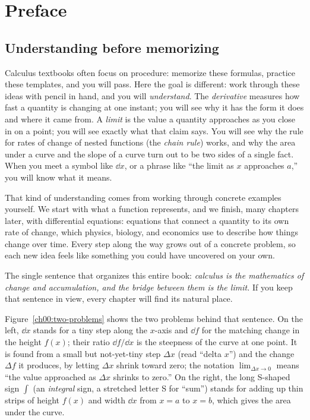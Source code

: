 \chapter*{Preface}

\section*{Understanding before memorizing}

Calculus textbooks often focus on procedure: memorize these formulas, practice these
templates, and you will pass. Here the goal is different: work through these ideas with pencil
in hand, and you will \emph{understand}. The \emph{derivative} measures how fast a quantity is
changing at one instant; you will see why it has the form it does and where it came from. A
\emph{limit} is the value a quantity approaches as you close in on a point; you will see exactly what
that claim says. You will see why the rule for rates of change of nested functions (the \emph{chain
rule}) works, and why the area under a curve and the slope of a curve turn out to be two sides of a
single fact. When you meet a symbol like $\dd x$, or a phrase like ``the limit as $x$ approaches
$a$,'' you will know what it means.

That kind of understanding comes from working through concrete examples yourself. We start with what a function represents, and we finish, many
chapters later, with differential equations: equations that connect a quantity to its own rate of
change, which physics, biology, and economics use to describe how things change over time. Every step along the way grows out of a concrete problem, so each new idea feels like something you could have uncovered on your own.

\begin{focusbox}
The single sentence that organizes this entire book: \emph{calculus is the mathematics of change and
accumulation, and the bridge between them is the limit.} If you keep that sentence in view, every
chapter will find its natural place.
\end{focusbox}

Figure~\ref{ch00:two-problems} shows the two problems behind that sentence. On the left, $\dd x$
stands for a tiny step along the $x$-axis and $\dd f$ for the matching change in the height
$f(x)$; their ratio $\dd f/\dd x$ is the steepness of the curve at one point. It is found from a
small but not-yet-tiny step $\Delta x$ (read ``delta $x$'') and the change $\Delta f$ it produces,
by letting $\Delta x$ shrink toward zero; the notation $\lim_{\Delta x\to 0}$ means ``the value
approached as $\Delta x$ shrinks to zero.'' On the right, the long S-shaped sign $\int$ (an
\emph{integral} sign, a stretched letter S for ``sum'') stands for adding up thin strips of
height $f(x)$ and width $\dd x$ from $x=a$ to $x=b$, which gives the area under the curve.

